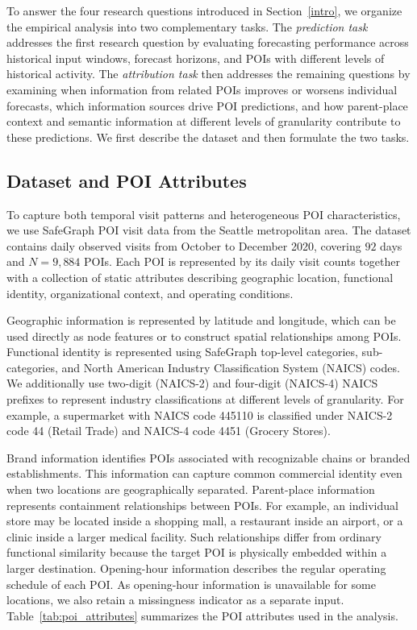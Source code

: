 \documentclass[preprint,authoryear,11pt]{elsarticle}
\theoremstyle{definition}
\begin{document}
To answer the four research questions introduced in Section~\ref{intro}, we organize the empirical analysis into two complementary tasks. 
The \textit{prediction task} addresses the first research question by evaluating forecasting performance across historical input windows, forecast horizons, and POIs with different levels of historical activity. 
The \textit{attribution task} then addresses the remaining questions by examining when information from related POIs improves or worsens individual forecasts, which information sources drive POI predictions, and how parent-place context and semantic information at different levels of granularity contribute to these predictions. We first describe the dataset and then formulate the two tasks.


\subsection{Dataset and POI Attributes}
\label{subsec:data}

To capture both temporal visit patterns and heterogeneous POI characteristics, we use SafeGraph POI visit data from the Seattle metropolitan area.
The dataset contains daily observed visits from October to December 2020, covering \(92\) days and \(N=9{,}884\) POIs.
Each POI is represented by its daily visit counts together with a collection of static attributes describing geographic location, functional identity, organizational context, and operating conditions.

Geographic information is represented by latitude and longitude, which can be used directly as node features or to construct spatial relationships among POIs.
Functional identity is represented using SafeGraph top-level categories, sub-categories, and North American Industry Classification System (NAICS) codes.
We additionally use two-digit (NAICS-2) and four-digit (NAICS-4) NAICS prefixes to represent industry classifications at different levels of granularity.
For example, a supermarket with NAICS code 445110 is classified under NAICS-2 code 44 (Retail Trade) and NAICS-4 code 4451 (Grocery Stores).

Brand information identifies POIs associated with recognizable chains or branded establishments.
This information can capture common commercial identity even when two locations are geographically separated.
Parent-place information represents containment relationships between POIs.
For example, an individual store may be located inside a shopping mall, a restaurant inside an airport, or a clinic inside a larger medical facility.
Such relationships differ from ordinary functional similarity because the target POI is physically embedded within a larger destination.
Opening-hour information describes the regular operating schedule of each POI.
As opening-hour information is unavailable for some locations, we also retain a missingness indicator as a separate input.
Table~\ref{tab:poi_attributes} summarizes the POI attributes used in the analysis.
\end{document}
